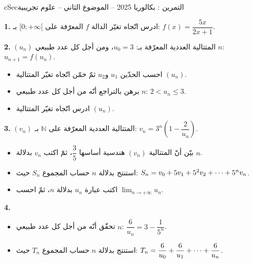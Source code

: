 \documentclass[12pt,a4paper]{article}
\newenvironment{BOX}[2]{\begin{otherlanguage}{english}\begin{arbox}{#1}{#2}}{\end{arbox}\end{otherlanguage}}
\newcounter{exo}
\newenvironment{tamrin}[1]{\stepcounter{exo}\begin{BOX}{cSec}{التمرين \theexo: #1}}{\end{BOX}}
\renewcommand{\cdots}{\mathinner{\cdotp\cdotp\cdotp}}
\newcommand{\N}{\mathbb{N}}
\newcommand{\limn}{\displaystyle\lim_{n\to+\infty}}
\newenvironment{sq}{\begin{itemize}[leftmargin=2.4em,itemsep=3pt]}{\end{itemize}}
\newcommand{\qa}{\item[(أ)]}\newcommand{\qb}{\item[(ب)]}\newcommand{\qc}{\item[(جـ)]}\newcommand{\qd}{\item[(د)]}\newcommand{\qe}{\item[(هـ)]}
\newcommand{\QQ}[1]{\par\smallskip\textbf{#1.} }
\begin{document}
\begin{tamrin}{بكالوريا 2025 -- الموضوع الثاني -- علوم تجريبية}
\QQ{1} ادرس اتّجاه تغيّر الدالة $f$ المعرّفة على $[0;+\infty[$ بـ: $f(x)=\dfrac{5x}{2x+1}$.

\QQ{2} $(u_n)$ المتتالية العددية المعرّفة بـ: $u_0=3$، ومن أجل كل عدد طبيعي $n$: $u_{n+1}=f(u_n)$.
\begin{sq}
\qa احسب الحدّين $u_1$ و$u_2$ ثمّ خمّن اتّجاه تغيّر المتتالية $(u_n)$.
\qb برهن بالتراجع أنّه من أجل كل عدد طبيعي $n$: $2<u_n\leqslant 3$.
\qc ادرس اتّجاه تغيّر المتتالية $(u_n)$.
\end{sq}
\QQ{3} $(v_n)$ المتتالية العددية المعرّفة على $\N$ بـ: $v_n=3^n\left(1-\dfrac{2}{u_n}\right)$.
\begin{sq}
\qa بيّن أنّ المتتالية $(v_n)$ هندسية أساسها $\dfrac35$، ثمّ اكتب $v_n$ بدلالة $n$.
\qb استنتج بدلالة $n$ حساب المجموع $S_n$ حيث: $S_n=v_0+5v_1+5^2v_2+\cdots+5^nv_n$.
\qc اكتب عبارة $u_n$ بدلالة $n$، ثمّ احسب $\limn u_n$.
\end{sq}
\QQ{4}
\begin{sq}
\qa تحقّق أنّه من أجل كل عدد طبيعي $n$: $\dfrac{6}{u_n}=3-\dfrac{1}{5^n}$.
\qb استنتج بدلالة $n$ حساب المجموع $T_n$ حيث: $T_n=\dfrac{6}{u_0}+\dfrac{6}{u_1}+\cdots+\dfrac{6}{u_n}$.
\end{sq}
\end{tamrin}
\end{document}
